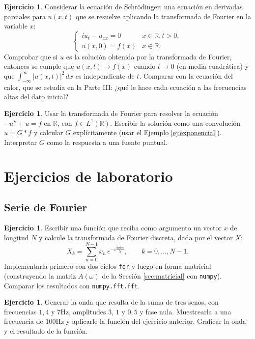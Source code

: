 \documentclass[12pt, a4paper]{amsbook}
\newcommand{\R}{{\mathbb R}}
\theoremstyle{remark}
\theoremstyle{definition}
\newtheorem{ejer}[teo]{Ejercicio}
\numberwithin{section}{chapter}
\numberwithin{subsection}{section}
\numberwithin{equation}{section}
\numberwithin{figure}{chapter}
\begin{document}
\begin{ejer}
Considerar la ecuación de Schrödinger, una ecuación en derivadas parciales para $u(x,t)$ que se resuelve aplicando la transformada de Fourier en la variable $x$:
$$
\begin{cases}
i u_t - u_{xx} = 0 & x\in\R, t>0,\\
u(x,0)=f(x) & x\in\R.
\end{cases}
$$
Comprobar que si $u$ es la solución obtenida por la transformada de Fourier, entonces se cumple que $u(x,t)\to f(x)$ cuando $t\to 0$ (en media cuadrática) y que $\int_{-\infty}^\infty |u(x,t)|^2\, dx$ es independiente de $t$. Comparar con la ecuación del calor, que se estudia en la Parte III: ¿qué le hace cada ecuación a las frecuencias altas del dato inicial?
\end{ejer}

\begin{ejer}
Usar la transformada de Fourier para resolver la ecuación $-u'' + u = f$ en $\R$, con $f\in L^1(\R)$. Escribir la solución como una convolución $u = G*f$ y calcular $G$ explícitamente (usar el Ejemplo \ref{ej:exponencial}). Interpretar $G$ como la respuesta a una fuente puntual.
\end{ejer}

\section{Ejercicios de laboratorio}

\subsection*{Serie de Fourier}

\begin{ejer}\label{ej:DFT} Escribir una función que reciba como argumento un vector $x$ de longitud $N$ y calcule la transformada de Fourier discreta, dada por el vector $X$:
\[X_k = \sum_{n=0}^{N-1}x_n\,e^{-i\frac{2\pi kn}{N}},\qquad k=0,\dots,N-1 .\]
Implementarla primero con dos ciclos \lstinline{for} y luego en forma matricial (construyendo la matriz $A(\omega)$ de la Sección \ref{sec:matricial} con \lstinline{numpy}). Comparar los resultados con \lstinline{numpy.fft.fft}.
\end{ejer}

\begin{ejer} Generar la onda que resulta de la suma de tres senos, con frecuencias $1,4$ y $7$Hz, amplitudes $3$, $1$ y $0{,}5$ y fase nula. Muestrearla a una frecuencia de $100$Hz y aplicarle la función del ejercicio anterior. Graficar la onda y  el resultado de la función.
\end{ejer}
\end{document}
